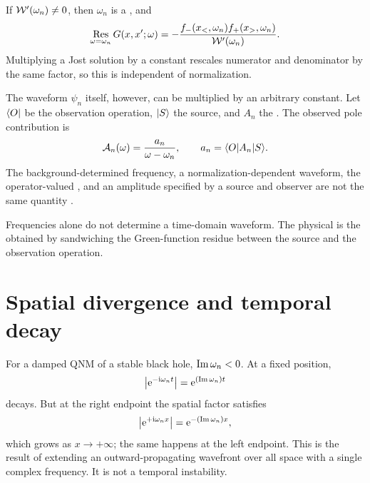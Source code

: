 If $\mathcal{W}'(\omega_n)\ne0$, then $\omega_n$ is a , and
\begin{equation}
\mathop{\mathrm{Res}}_{\omega=\omega_n}
G(x,x';\omega)
=
-\frac{
f_-(x_<,\omega_n)f_+(x_>,\omega_n)
}{
\mathcal{W}'(\omega_n)
}.
\label{eq:qnm_green_residue}
\end{equation}
Multiplying a Jost solution by a constant rescales numerator and denominator by the same factor, so this  is independent of normalization.

The  waveform $\psi_n$ itself, however, can be multiplied by an arbitrary constant. Let $\langle O \rvert$ be the observation operation, $\lvert S \rangle$ the source, and $A_n$ the . The observed pole contribution is
\begin{equation}
\mathcal{A}_n(\omega)
=
\frac{a_n}{\omega-\omega_n},
\qquad
a_n
=
\langle O \rvert A_n\lvert S \rangle.
\label{eq:qnm-observable-residue}
\end{equation}
The background-determined frequency, a normalization-dependent waveform, the operator-valued , and an amplitude specified by a source and observer are not the same quantity \cite{Motohashi:2024fwt}.

\begin{principlebox}
Frequencies alone do not determine a time-domain waveform. The physical  is the  obtained by sandwiching the Green-function residue between the source and the observation operation.
\end{principlebox}

\section{Spatial divergence and temporal decay}

For a damped QNM of a stable black hole, $\operatorname{Im}\omega_n<0$. At a fixed position,
\begin{equation}
\left|\mathrm{e}^{-\mathrm{i}\omega_n t}\right|
=
\mathrm{e}^{(\operatorname{Im}\omega_n)t}
\end{equation}
decays. But at the right endpoint the spatial factor satisfies
\begin{equation}
\left|\mathrm{e}^{+\mathrm{i}\omega_n x}\right|
=
\mathrm{e}^{-(\operatorname{Im}\omega_n)x},
\end{equation}
which grows as $x\to+\infty$; the same happens at the left endpoint. This is the result of extending an outward-propagating wavefront over all space with a single complex frequency. It is not a temporal instability.

